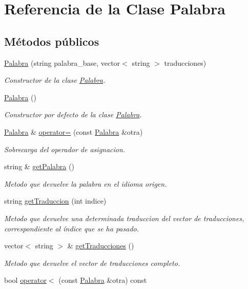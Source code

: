 \hypertarget{classPalabra}{\section{\-Referencia de la \-Clase \-Palabra}
\label{classPalabra}
}
\subsection*{\-Métodos públicos}
\begin{DoxyCompactItemize}
\item 
\hyperlink{classPalabra_a750c8424b22762173f539c13b61fb0f9}{\-Palabra} (string palabra\-\_\-base, vector$<$ string $>$ traducciones)
\begin{DoxyCompactList}\small\item\em \-Constructor de la clase \hyperlink{classPalabra}{\-Palabra}. \end{DoxyCompactList}\item 
\hyperlink{classPalabra_a8e74f02e148cdcb5bb91bc2ae193183e}{\-Palabra} ()
\begin{DoxyCompactList}\small\item\em \-Constructor por defecto de la clase \hyperlink{classPalabra}{\-Palabra}. \end{DoxyCompactList}\item 
\hyperlink{classPalabra}{\-Palabra} \& \hyperlink{classPalabra_a7c1fd233939eec26eeb9a22b0de284b0}{operator=} (const \hyperlink{classPalabra}{\-Palabra} \&otra)
\begin{DoxyCompactList}\small\item\em \-Sobrecarga del operador de asignacion. \end{DoxyCompactList}\item 
string \& \hyperlink{classPalabra_aeff60d82b4048f076908a64b6071a2fa}{get\-Palabra} ()
\begin{DoxyCompactList}\small\item\em \-Metodo que devuelve la palabra en el idioma origen. \end{DoxyCompactList}\item 
string \hyperlink{classPalabra_a0855ad4b00364b17ea34e81516f7283d}{get\-Traduccion} (int indice)
\begin{DoxyCompactList}\small\item\em \-Metodo que devuelve una determinada traduccion del vector de traducciones, correspondiente al índice que se ha pasado. \end{DoxyCompactList}\item 
vector$<$ string $>$ \& \hyperlink{classPalabra_aa15fbedb2557d0f9435bf8afe7100415}{get\-Traducciones} ()
\begin{DoxyCompactList}\small\item\em \-Metodo que devuelve el vector de traducciones completo. \end{DoxyCompactList}\item 
\hypertarget{classPalabra_a92c5be578080ddd1a85757b65bf38408}{bool \hyperlink{classPalabra_a92c5be578080ddd1a85757b65bf38408}{operator$<$} (const \hyperlink{classPalabra}{\-Palabra} \&otra) const }\label{classPalabra_a92c5be578080ddd1a85757b65bf38408}


\end{DoxyCompactItemize}
